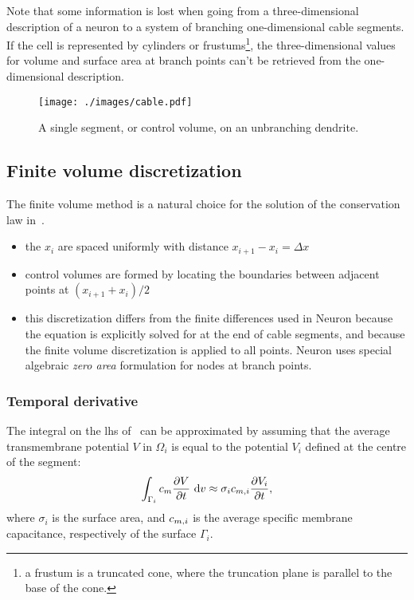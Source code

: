 Note that some information is lost when going from a three-dimensional description of a neuron to a system of branching one-dimensional cable segments.
If the cell is represented by cylinders or frustums\footnote{a frustum is a truncated cone, where the truncation plane is parallel to the base of the cone.}, the three-dimensional values for volume and surface area at branch points can't be retrieved from the one-dimensional description.

\begin{figure}
    \begin{center}
        \texttt{[image: ./images/cable.pdf]}
    \end{center}
    \caption{A single segment, or control volume, on an unbranching dendrite.}
    \label{fig:segment}
\end{figure}

\subsection{Finite volume discretization}
The finite volume method is a natural choice for the solution of the conservation law in~.

\begin{itemize}
    \item   the $x_i$ are spaced uniformly with distance $x_{i+1}-x_{i} = \Delta x$
    \item   control volumes are formed by locating the boundaries between adjacent points at $(x_{i+1}+x_{i})/2$
    \item   this discretization differs from the finite differences used in Neuron because the equation is explicitly solved for at the end of cable segments, and because the finite volume discretization is applied to all points. Neuron uses special algebraic \emph{zero area} formulation for nodes at branch points.
\end{itemize}

\subsubsection{Temporal derivative}
The integral on the lhs of~ can be approximated by assuming that the average transmembrane potential $V$ in $\Omega_i$ is equal to the potential $V_i$ defined at the centre of the segment:
\begin{equation}
    \int_{\Gamma_i}{c_m \frac{\partial{V}}{\partial{t}} } ~\text{d}{v} \approx \sigma_i c_{m,i} \frac{\partial{V_i}}{\partial{t}},
    \label{eq:dvdt}
\end{equation}
where $\sigma_i$ is the surface area, and $c_{m,i}$ is the average specific membrane capacitance, respectively of the surface $\Gamma_i$.


